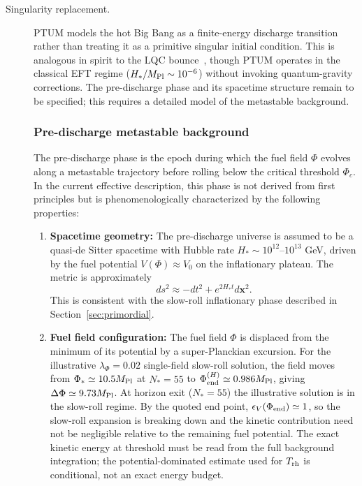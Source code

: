 \documentclass[epj]{svjour}
\begin{document}
\begin{description}

\item[Singularity replacement.] 
PTUM models the hot Big Bang as a finite-energy discharge transition
rather than treating it as a primitive singular initial condition. This is analogous in spirit to
the LQC bounce~\cite{Bojowald2001,Ashtekar2011}, though PTUM operates in the classical EFT regime
($H_*/M_{\rm Pl}\sim10^{-6}$) without invoking quantum-gravity
corrections. The pre-discharge phase and its spacetime structure
remain to be specified; this requires a detailed model of the
metastable background.

\subsubsection{Pre-discharge metastable background}
\label{sec:pre_discharge}

The pre-discharge phase is the epoch during which the fuel field
$\Phi$ evolves along a metastable trajectory before rolling below the
critical threshold $\Phi_c$. In the current effective description,
this phase is not derived from first principles but is
phenomenologically characterized by the following properties:

\begin{enumerate}
\item \textbf{Spacetime geometry:} The pre-discharge universe is
      assumed to be a quasi-de Sitter spacetime with Hubble rate
      $H_* \sim 10^{12}$--$10^{13}$ GeV, driven by the fuel potential
      $V(\Phi) \approx V_0$ on the inflationary plateau. The metric
      is approximately
      \begin{equation}
      ds^2 \approx -dt^2 + e^{2H_* t}d\mathbf{x}^2.
      \end{equation}
      This is consistent with the slow-roll inflationary phase
      described in Section~\ref{sec:primordial}.

\item \textbf{Fuel field configuration:} The fuel field $\Phi$ is
      displaced from the minimum of its potential by a super-Planckian
      excursion. For the illustrative $\lambda_\Phi=0.02$
      single-field slow-roll solution, the field moves from
      $\Phi_*\simeq10.5M_{\rm Pl}$ at $N_*=55$ to
      $\Phi_{\rm end}^{(H)}\simeq0.986M_{\rm Pl}$, giving
      $\Delta\Phi\simeq9.73M_{\rm Pl}$.
      At horizon exit ($N_*=55$) the illustrative solution is in
      the slow-roll regime. By the quoted end point,
      $\epsilon_V(\Phi_{\rm end})\simeq1$, so the slow-roll expansion
      is breaking down and the kinetic contribution need not be
      negligible relative to the remaining fuel potential. The exact
      kinetic energy at threshold must be read from the full
      background integration; the potential-dominated estimate used
      for $T_{\rm rh}$ is conditional, not an exact energy budget.


\end{enumerate}
\end{description}
\end{document}
